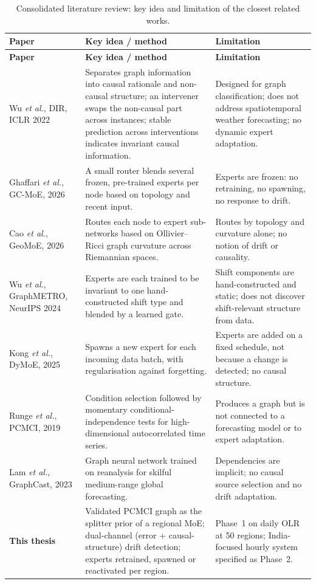 \begin{small}
\renewcommand{\arraystretch}{1.25}
\begin{longtable}{>{\raggedright\arraybackslash}p{3.6cm}>{\raggedright\arraybackslash}p{5.4cm}>{\raggedright\arraybackslash}p{5.4cm}}
\caption{Consolidated literature review: key idea and limitation of the closest related works.}\label{tab:lit}\\
\toprule
\textbf{Paper} & \textbf{Key idea / method} & \textbf{Limitation} \\
\midrule
\endfirsthead
\toprule
\textbf{Paper} & \textbf{Key idea / method} & \textbf{Limitation} \\
\midrule
\endhead
\bottomrule
\endfoot
Wu \emph{et al.}, DIR, ICLR 2022~\cite{wu2022discovering} & Separates graph information into causal rationale and non-causal structure; an intervener swaps the non-causal part across instances; stable prediction across interventions indicates invariant causal information. & Designed for graph classification; does not address spatiotemporal weather forecasting; no dynamic expert adaptation. \\
Ghaffari \emph{et al.}, GC-MoE, 2026~\cite{ghaffari2026graph} & A small router blends several frozen, pre-trained experts per node based on topology and recent input. & Experts are frozen: no retraining, no spawning, no response to drift. \\
Cao \emph{et al.}, GeoMoE, 2026~\cite{cao2026geometric} & Routes each node to expert sub-networks based on Ollivier--Ricci graph curvature across Riemannian spaces. & Routes by topology and curvature alone; no notion of drift or causality. \\
Wu \emph{et al.}, GraphMETRO, NeurIPS 2024~\cite{wu2024graphmetro} & Experts are each trained to be invariant to one hand-constructed shift type and blended by a learned gate. & Shift components are hand-constructed and static; does not discover shift-relevant structure from data. \\
Kong \emph{et al.}, DyMoE, 2025~\cite{kong2025dynamic} & Spawns a new expert for each incoming data batch, with regularisation against forgetting. & Experts are added on a fixed schedule, not because a change is detected; no causal structure. \\
Runge \emph{et al.}, PCMCI, 2019~\cite{runge2019detecting} & Condition selection followed by momentary conditional-independence tests for high-dimensional autocorrelated time series. & Produces a graph but is not connected to a forecasting model or to expert adaptation. \\
Lam \emph{et al.}, GraphCast, 2023~\cite{lam2023learning} & Graph neural network trained on reanalysis for skilful medium-range global forecasting. & Dependencies are implicit; no causal source selection and no drift adaptation. \\
\midrule
\textbf{This thesis} & Validated PCMCI graph as the splitter prior of a regional MoE; dual-channel (error + causal-structure) drift detection; experts retrained, spawned or reactivated per region. & Phase~1 on daily OLR at 50 regions; India-focused hourly system specified as Phase~2. \\
\end{longtable}
\end{small}

